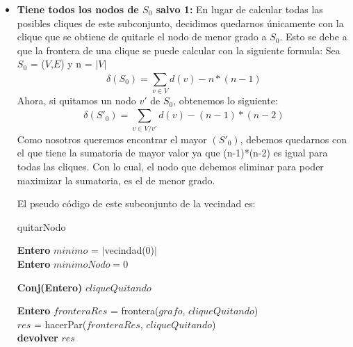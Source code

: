 \begin{itemize}
\item \textbf{Tiene todos los nodos de $S_{0}$ salvo 1:} \newline En lugar de calcular todas las posibles cliques de este subconjunto, decidimos quedarnos únicamente con la clique que se obtiene de quitarle el nodo de menor grado a $S_{0}$. Esto se debe a que la frontera de una clique se puede calcular con la siguiente formula:\newline
Sea $S_{0}$ = ($V$,$E$) y n = $|$$V$$|$
\begin{equation}
  \delta(S_{0}) = \sum_{v \in V}^{} d(v) - n*(n-1)
\end{equation}
Ahora, si quitamos un nodo $v'$ de $S_{0}$, obtenemos lo siguiente:
\begin{equation}
  \delta(S'_{0}) = \sum_{v \in V/v'}^{} d(v) - (n-1)*(n-2)
\end{equation}
Como nosotros queremos encontrar el mayor \delta$(S'_{0})$, debemos quedarnos con el que tiene la sumatoria de mayor valor ya que (n-1)*(n-2) es igual para todas las cliques. Con lo cual, el nodo que debemos eliminar para poder maximizar la sumatoria, es el de menor grado.

El pseudo código de este subconjunto de la vecindad es:\newline
\begin{algorithm}[H]
    \SetAlgoLined
    \caption{quitarNodo}
	
    \textbf{Entero} $minimo$ = $|$vecindad(0)$|$ \\	
    \textbf{Entero} $minimoNodo = 0$ \\
    
    \textbf{Conj(Entero)} $cliqueQuitando$\\

    
    \textbf{Entero} $fronteraRes$ = frontera($grafo$, $cliqueQuitando$)\\
    $res$ = hacerPar($fronteraRes$, $cliqueQuitando$)\\
    \textbf{devolver} $res$ \\
\end{algorithm}


\end{itemize}
